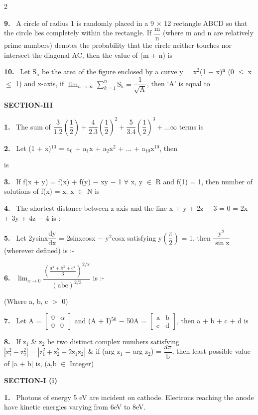 \documentclass[10pt]{extarticle}
\newcommand{\papersec}[1]{\par\bigskip{\centering\Large\bfseries PAPER-#1\par}\medskip}
\newcommand{\partsec}[2]{\par\medskip\noindent{\large\bfseries PART-#1: #2}\par\smallskip}
\newcommand{\sect}[1]{\par\smallskip\noindent\textbf{#1}\par}
\newcommand{\qn}[1]{\par\smallskip\noindent\textbf{#1.}~}
\begin{document}
\begin{multicols}{2}
\qn{9} A circle of radius 1 is randomly placed in a 9 $\times$ 12 rectangle ABCD so that the circle lies completely within the rectangle. If $\dfrac{\mathrm m}{\mathrm n}$ (where m and n are relatively prime numbers) denotes the probability that the circle neither touches nor intersect the diagonal AC, then the value of (m + n) is
\qn{10} Let S$_\mathrm n$ be the area of the figure enclosed by a curve y = x$^2$(1 $-$ x)$^\mathrm n$ (0 $\le$ x $\le$ 1) and x-axis, if $\displaystyle\lim_{n\to\infty}\sum_{k=1}^{n}\mathrm S_\mathrm k=\dfrac1{\sqrt{\mathrm A}}$, then `A' is equal to
\sect{SECTION-III}
\qn{1} The sum of $\dfrac3{1.2}\left(\dfrac12\right)+\dfrac4{2.3}\left(\dfrac12\right)^2+\dfrac5{3.4}\left(\dfrac12\right)^3+\ldots\infty$ terms is
\qn{2} Let (1 + x)$^{10}$ = a$_0$ + a$_1$x + a$_2$x$^2$ + ... + a$_{10}$x$^{10}$, then\par
{} is
\qn{3} If f(x + y) = f(x) + f(y) $-$ xy $-$ 1 $\forall$ x, y $\in$ R and f(1) = 1, then number of solutions of f(x) = x, x $\in$ N is
\qn{4} The shortest distance between z-axis and the line x + y + 2z $-$ 3 = 0 = 2x + 3y + 4z $-$ 4 is :-
\qn{5} Let 2ysinx$\dfrac{\mathrm{dy}}{\mathrm{dx}}$ = 2sinxcosx $-$ y$^2$cosx satisfying y$\left(\dfrac\pi2\right)$ = 1, then $\dfrac{\mathrm y^2}{\sin\mathrm x}$ (wherever defined) is :-
\qn{6} $\displaystyle\lim_{x\to0}\dfrac{\left(\frac{\mathrm a^{\mathrm x}+\mathrm b^{\mathrm x}+\mathrm c^{\mathrm x}}{3}\right)^{2/\mathrm x}}{(\mathrm{abc})^{2/3}}$ is :-\par
(Where a, b, c $>$ 0)
\qn{7} Let A = $\begin{bmatrix}0&\alpha\\0&0\end{bmatrix}$ and (A + I)$^{50}$ $-$ 50A = $\begin{bmatrix}\mathrm a&\mathrm b\\\mathrm c&\mathrm d\end{bmatrix}$, then a + b + c + d is
\qn{8} If z$_1$ \& z$_2$ be two distinct complex numbers satisfying $\left|\mathrm z_1^2-\mathrm z_2^2\right|=\left|\bar{\mathrm z}_1^2+\bar{\mathrm z}_2^2-2\bar{\mathrm z}_1\bar{\mathrm z}_2\right|$ \& if (arg z$_1$ $-$ arg z$_2$) = $\dfrac{\mathrm a\pi}{\mathrm b}$, then least possible value of $|$a + b$|$ is, (a,b $\in$ Integer)
\raggedcolumns
\papersec{2}
\partsec{1}{PHYSICS}
\sect{SECTION-I (i)}
\qn{1} Photons of energy 5 eV are incident on cathode. Electrons reaching the anode have kinetic energies varying from 6eV to 8eV.\par

\end{multicols}
\end{document}

